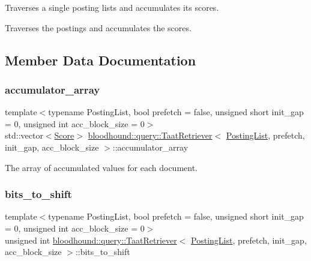 Traverses a single posting lists and accumulates its scores. 

Traverses the postings and accumulates the scores. 

\subsection{Member Data Documentation}
\mbox{\label{classbloodhound_1_1query_1_1TaatRetriever_a604c7ab279ced03ccc1866d55c844b11}} 
\subsubsection{\texorpdfstring{accumulator\+\_\+array}{accumulator\_array}}
{\footnotesize\ttfamily template$<$typename Posting\+List, bool prefetch = false, unsigned short init\+\_\+gap = 0, unsigned int acc\+\_\+block\+\_\+size = 0$>$ \\
std\+::vector$<$\mbox{\hyperlink{structbloodhound_1_1Score}{Score}}$>$ \mbox{\hyperlink{classbloodhound_1_1query_1_1TaatRetriever}{bloodhound\+::query\+::\+Taat\+Retriever}}$<$ \mbox{\hyperlink{classbloodhound_1_1PostingList}{Posting\+List}}, prefetch, init\+\_\+gap, acc\+\_\+block\+\_\+size $>$\+::accumulator\+\_\+array\hspace{0.3cm}{\ttfamily [protected]}}



The array of accumulated values for each document. 

\mbox{\label{classbloodhound_1_1query_1_1TaatRetriever_aa2b4875de4f02a856e64560bf002296f}} 
\subsubsection{\texorpdfstring{bits\+\_\+to\+\_\+shift}{bits\_to\_shift}}
{\footnotesize\ttfamily template$<$typename Posting\+List, bool prefetch = false, unsigned short init\+\_\+gap = 0, unsigned int acc\+\_\+block\+\_\+size = 0$>$ \\
unsigned int \mbox{\hyperlink{classbloodhound_1_1query_1_1TaatRetriever}{bloodhound\+::query\+::\+Taat\+Retriever}}$<$ \mbox{\hyperlink{classbloodhound_1_1PostingList}{Posting\+List}}, prefetch, init\+\_\+gap, acc\+\_\+block\+\_\+size $>$\+::bits\+\_\+to\+\_\+shift\hspace{0.3cm}{\ttfamily [protected]}}

